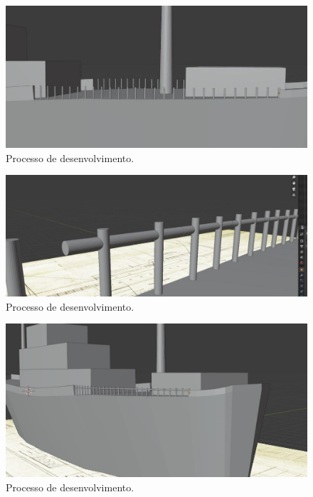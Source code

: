 \begin{figure}[!h]
    \centering
    \includegraphics[scale=0.5]{imagens/p2.jpg}
    \caption{Processo de desenvolvimento.}
    \label{fig:p2}
\end{figure}

\begin{figure}[!h]
    \centering
    \includegraphics[scale=0.4]{imagens/p3.jpg}
    \caption{Processo de desenvolvimento.}
    \label{fig:p3}
\end{figure}

\begin{figure}[!h]
    \centering
    \includegraphics[scale=0.5]{imagens/p4.jpg}
    \caption{Processo de desenvolvimento.}
    \label{fig:p4}
\end{figure}

